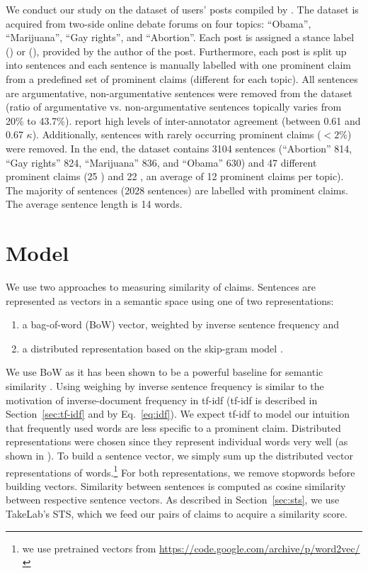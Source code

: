 We conduct our study on the dataset of users' posts compiled by \citet{hasan2014you}. 
The dataset is acquired from two-side online debate forums on four topics: 
``Obama'', ``Marijuana'', ``Gay rights'', and ``Abortion''.
Each post is assigned a stance label () or (), provided by
the author of the post. 
Furthermore, each post is split up into sentences and each sentence is manually labelled
with one prominent claim from a predefined set of prominent claims 
(different for each topic). 
All sentences are argumentative, non-argumentative sentences were removed from
the dataset (ratio of argumentative vs. non-argumentative sentences topically
varies from  20\% to 43.7\%). 
\citet{hasan2014you} report high levels of inter-annotator agreement (between
0.61 and 0.67 $\kappa$). 
Additionally, sentences with rarely occurring prominent claims ($<2\%$) were removed. 
In the end, the dataset contains 3104 sentences (``Abortion'' 814, ``Gay rights'' 824, 
``Marijuana'' 836, and ``Obama'' 630) and 47 different prominent claims
(25 ) and 22 , an
average of 12 prominent claims per topic). The majority of sentences (2028
sentences) are labelled with  prominent claims.
The average sentence length is 14 words. 

\section{Model}
\label{sec:argclu_model}

We use two approaches to measuring similarity of claims. 
Sentences are represented as vectors in a semantic space
using one of two representations:
\begin{enumerate} 
\item a bag-of-word (BoW) vector, weighted
by inverse sentence frequency and 
\item a distributed representation based on the skip-gram model
	\citep{mikolov2013distributed}. 
\end{enumerate}
We use BoW as it has been shown to be a powerful baseline for semantic
similarity \citep{ramage2009random}. 
Using weighing by inverse sentence frequency is similar to the motivation 
of inverse-document frequency in tf-idf (tf-idf is described in
Section~\ref{sec:tf-idf} and by Eq.~\ref{eq:idf}). We expect tf-idf 
to model our intuition that frequently used words are less
specific to a prominent claim. 
Distributed representations were chosen since they represent individual words 
very well (as shown in \citep{mikolov2013efficient, mikolov2013distributed}).
To build a sentence vector, we simply sum up the distributed vector representations 
of words.\footnote{we use pretrained vectors from \url{https://code.google.com/archive/p/word2vec/}}
For both representations, we remove stopwords before building vectors. 
Similarity between sentences is computed as cosine similarity between 
respective sentence vectors. 
As described in Section~\ref{sec:sts}, we use TakeLab's STS, which we feed our pairs
of claims to acquire a similarity score. 


